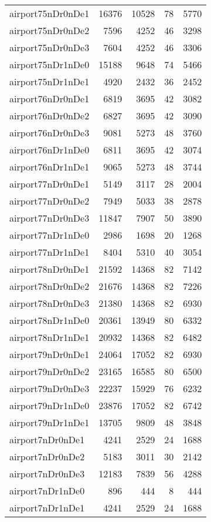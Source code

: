 \begin{longtable}{lrrrr}
airport75nDr0nDe1 & 16376 & 10528 & 78 & 5770 \\
airport75nDr0nDe2 & 7596 & 4252 & 46 & 3298 \\
airport75nDr0nDe3 & 7604 & 4252 & 46 & 3306 \\
airport75nDr1nDe0 & 15188 & 9648 & 74 & 5466 \\
airport75nDr1nDe1 & 4920 & 2432 & 36 & 2452 \\
airport76nDr0nDe1 & 6819 & 3695 & 42 & 3082 \\
airport76nDr0nDe2 & 6827 & 3695 & 42 & 3090 \\
airport76nDr0nDe3 & 9081 & 5273 & 48 & 3760 \\
airport76nDr1nDe0 & 6811 & 3695 & 42 & 3074 \\
airport76nDr1nDe1 & 9065 & 5273 & 48 & 3744 \\
airport77nDr0nDe1 & 5149 & 3117 & 28 & 2004 \\
airport77nDr0nDe2 & 7949 & 5033 & 38 & 2878 \\
airport77nDr0nDe3 & 11847 & 7907 & 50 & 3890 \\
airport77nDr1nDe0 & 2986 & 1698 & 20 & 1268 \\
airport77nDr1nDe1 & 8404 & 5310 & 40 & 3054 \\
airport78nDr0nDe1 & 21592 & 14368 & 82 & 7142 \\
airport78nDr0nDe2 & 21676 & 14368 & 82 & 7226 \\
airport78nDr0nDe3 & 21380 & 14368 & 82 & 6930 \\
airport78nDr1nDe0 & 20361 & 13949 & 80 & 6332 \\
airport78nDr1nDe1 & 20932 & 14368 & 82 & 6482 \\
airport79nDr0nDe1 & 24064 & 17052 & 82 & 6930 \\
airport79nDr0nDe2 & 23165 & 16585 & 80 & 6500 \\
airport79nDr0nDe3 & 22237 & 15929 & 76 & 6232 \\
airport79nDr1nDe0 & 23876 & 17052 & 82 & 6742 \\
airport79nDr1nDe1 & 13705 & 9809 & 48 & 3848 \\
airport7nDr0nDe1 & 4241 & 2529 & 24 & 1688 \\
airport7nDr0nDe2 & 5183 & 3011 & 30 & 2142 \\
airport7nDr0nDe3 & 12183 & 7839 & 56 & 4288 \\
airport7nDr1nDe0 & 896 & 444 & 8 & 444 \\
airport7nDr1nDe1 & 4241 & 2529 & 24 & 1688 \\

\end{longtable}
